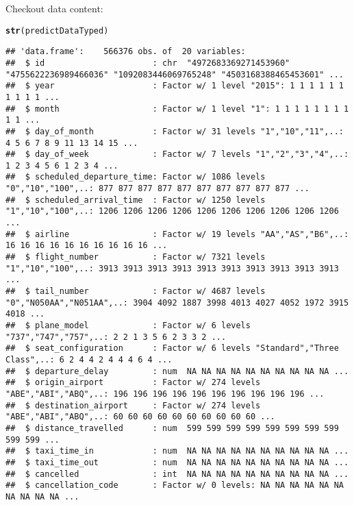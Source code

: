 \documentclass{article}\usepackage[]{graphicx}\usepackage[]{color}
\makeatletter
\newcommand{\hlstd}[1]{\textcolor[rgb]{0.345,0.345,0.345}{#1}}%
\newcommand{\hlkwd}[1]{\textcolor[rgb]{0.737,0.353,0.396}{\textbf{#1}}}%
\newenvironment{kframe}{%
 \def\at@end@of@kframe{}%
 \ifinner\ifhmode%
  \def\at@end@of@kframe{\end{minipage}}%
  \begin{minipage}{\columnwidth}%
 \fi\fi%
 \def\FrameCommand##1{\hskip\@totalleftmargin \hskip-\fboxsep
 \colorbox{shadecolor}{##1}\hskip-\fboxsep
     \hskip-\linewidth \hskip-\@totalleftmargin \hskip\columnwidth}%
 \MakeFramed {\advance\hsize-\width
   \@totalleftmargin\z@ \linewidth\hsize
   \@setminipage}}%
 {\par\unskip\endMakeFramed%
 \at@end@of@kframe}
\newenvironment{knitrout}{}{} %
\makeatother
\begin{document}
Checkout data content:
\begin{knitrout}
\color{fgcolor}\begin{kframe}
\begin{alltt}
\hlkwd{str}\hlstd{(predictDataTyped)}
\end{alltt}
\begin{verbatim}
## 'data.frame':	566376 obs. of  20 variables:
##  $ id                      : chr  "4972683369271453960" "4755622236989466036" "1092083446069765248" "4503168388465453601" ...
##  $ year                    : Factor w/ 1 level "2015": 1 1 1 1 1 1 1 1 1 1 ...
##  $ month                   : Factor w/ 1 level "1": 1 1 1 1 1 1 1 1 1 1 ...
##  $ day_of_month            : Factor w/ 31 levels "1","10","11",..: 4 5 6 7 8 9 11 13 14 15 ...
##  $ day_of_week             : Factor w/ 7 levels "1","2","3","4",..: 1 2 3 4 5 6 1 2 3 4 ...
##  $ scheduled_departure_time: Factor w/ 1086 levels "0","10","100",..: 877 877 877 877 877 877 877 877 877 877 ...
##  $ scheduled_arrival_time  : Factor w/ 1250 levels "1","10","100",..: 1206 1206 1206 1206 1206 1206 1206 1206 1206 1206 ...
##  $ airline                 : Factor w/ 19 levels "AA","AS","B6",..: 16 16 16 16 16 16 16 16 16 16 ...
##  $ flight_number           : Factor w/ 7321 levels "1","10","100",..: 3913 3913 3913 3913 3913 3913 3913 3913 3913 3913 ...
##  $ tail_number             : Factor w/ 4687 levels "0","N050AA","N051AA",..: 3904 4092 1887 3998 4013 4027 4052 1972 3915 4018 ...
##  $ plane_model             : Factor w/ 6 levels "737","747","757",..: 2 2 1 3 5 6 2 3 3 2 ...
##  $ seat_configuration      : Factor w/ 6 levels "Standard","Three Class",..: 6 2 4 4 2 4 4 4 6 4 ...
##  $ departure_delay         : num  NA NA NA NA NA NA NA NA NA NA ...
##  $ origin_airport          : Factor w/ 274 levels "ABE","ABI","ABQ",..: 196 196 196 196 196 196 196 196 196 196 ...
##  $ destination_airport     : Factor w/ 274 levels "ABE","ABI","ABQ",..: 60 60 60 60 60 60 60 60 60 60 ...
##  $ distance_travelled      : num  599 599 599 599 599 599 599 599 599 599 ...
##  $ taxi_time_in            : num  NA NA NA NA NA NA NA NA NA NA ...
##  $ taxi_time_out           : num  NA NA NA NA NA NA NA NA NA NA ...
##  $ cancelled               : int  NA NA NA NA NA NA NA NA NA NA ...
##  $ cancellation_code       : Factor w/ 0 levels: NA NA NA NA NA NA NA NA NA NA ...
\end{verbatim}
\end{kframe}
\end{knitrout}
\end{document}
